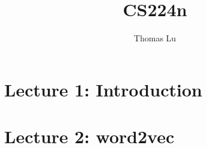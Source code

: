 \documentclass{article}
\title{CS224n}
\author{Thomas Lu}
\date{}
\begin{document}
\maketitle
\section{Lecture 1: Introduction}

\section{Lecture 2: word2vec}

\end{document}
